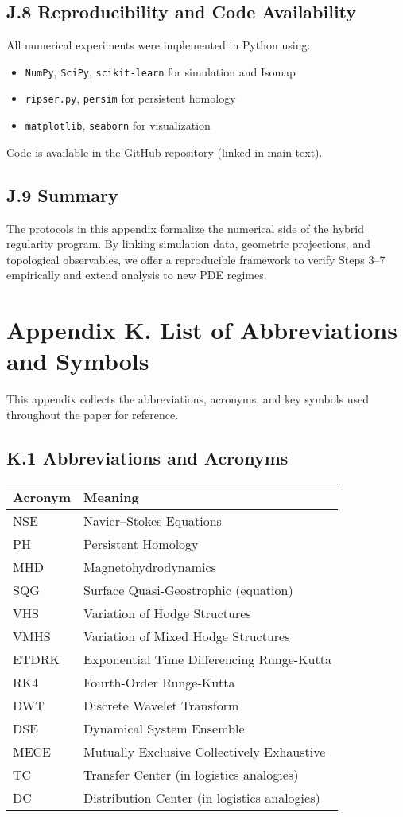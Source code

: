 \documentclass[11pt]{article}
\theoremstyle{definition}
\begin{document}
\subsection*{J.8 Reproducibility and Code Availability}
All numerical experiments were implemented in Python using:
\begin{itemize}
  \item \texttt{NumPy}, \texttt{SciPy}, \texttt{scikit-learn} for simulation and Isomap
  \item \texttt{ripser.py}, \texttt{persim} for persistent homology
  \item \texttt{matplotlib}, \texttt{seaborn} for visualization
\end{itemize}
Code is available in the GitHub repository (linked in main text).

\subsection*{J.9 Summary}
The protocols in this appendix formalize the numerical side of the hybrid regularity program. By linking simulation data, geometric projections, and topological observables, we offer a reproducible framework to verify Steps 3--7 empirically and extend analysis to new PDE regimes.


\section*{Appendix K. List of Abbreviations and Symbols}

This appendix collects the abbreviations, acronyms, and key symbols used throughout the paper for reference.

\subsection*{K.1 Abbreviations and Acronyms}
\begin{tabular}{ll}
\textbf{Acronym} & \textbf{Meaning} \\
\hline
NSE & Navier--Stokes Equations \\
PH & Persistent Homology \\
MHD & Magnetohydrodynamics \\
SQG & Surface Quasi-Geostrophic (equation) \\
VHS & Variation of Hodge Structures \\
VMHS & Variation of Mixed Hodge Structures \\
ETDRK & Exponential Time Differencing Runge-Kutta \\
RK4 & Fourth-Order Runge-Kutta \\
DWT & Discrete Wavelet Transform \\
DSE & Dynamical System Ensemble \\
MECE & Mutually Exclusive Collectively Exhaustive \\
TC & Transfer Center (in logistics analogies) \\
DC & Distribution Center (in logistics analogies) \\
\end{tabular}
\end{document}

